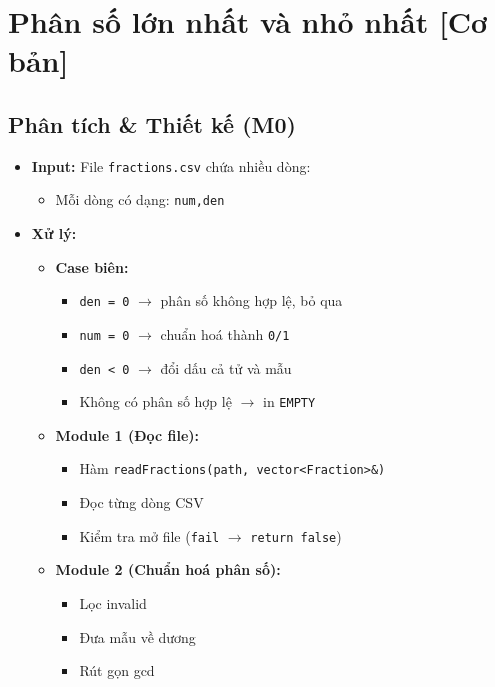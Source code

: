 \section{Phân số lớn nhất và nhỏ nhất [Cơ bản]}
\subsection{Phân tích \& Thiết kế (M0)}
\begin{itemize}
    \item \textbf{Input:}
    File \texttt{fractions.csv} chứa nhiều dòng:
    \begin{itemize}
        \item Mỗi dòng có dạng: \texttt{num,den}
    \end{itemize}

    \item \textbf{Xử lý:}
    \begin{itemize}
        \item \textbf{Case biên:}
        \begin{itemize}
            \item \texttt{den = 0} $\rightarrow$ phân số không hợp lệ, bỏ qua
            \item \texttt{num = 0} $\rightarrow$ chuẩn hoá thành \texttt{0/1}
            \item \texttt{den < 0} $\rightarrow$ đổi dấu cả tử và mẫu
            \item Không có phân số hợp lệ $\rightarrow$ in \texttt{EMPTY}
        \end{itemize}

        \item \textbf{Module 1 (Đọc file):}
        \begin{itemize}
            \item Hàm \texttt{readFractions(path, vector<Fraction>\&)}
            \item Đọc từng dòng CSV
            \item Kiểm tra mở file (\texttt{fail} $\rightarrow$ \texttt{return false})
        \end{itemize}

        \item \textbf{Module 2 (Chuẩn hoá phân số):}
        \begin{itemize}
            \item Lọc invalid
            \item Đưa mẫu về dương
            \item Rút gọn gcd
        \end{itemize}


\end{itemize}
\end{itemize}
